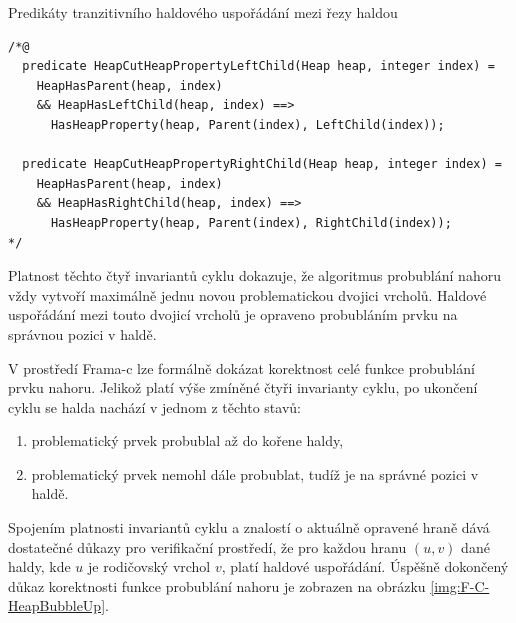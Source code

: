 \begin{listing}[H]
	\caption{Predikáty tranzitivního haldového uspořádání mezi řezy haldou}
	\label{acsl:HeapCutHeapPropertyTransitive}
	\begin{verbatim}
/*@
  predicate HeapCutHeapPropertyLeftChild(Heap heap, integer index) = 
    HeapHasParent(heap, index)
    && HeapHasLeftChild(heap, index) ==>
      HasHeapProperty(heap, Parent(index), LeftChild(index));

  predicate HeapCutHeapPropertyRightChild(Heap heap, integer index) =
    HeapHasParent(heap, index)
    && HeapHasRightChild(heap, index) ==>
      HasHeapProperty(heap, Parent(index), RightChild(index));
*/
	\end{verbatim}
\end{listing}

Platnost těchto čtyř invariantů cyklu dokazuje, že algoritmus probublání nahoru vždy vytvoří maximálně jednu novou problematickou dvojici vrcholů. Haldové uspořádání mezi touto dvojicí vrcholů je opraveno probubláním prvku na správnou pozici v haldě.

V prostředí Frama-c lze formálně dokázat korektnost celé funkce probublání prvku nahoru. Jelikož platí výše zmíněné čtyři invarianty cyklu, po ukončení cyklu se halda nachází v jednom z těchto stavů:

\begin{enumerate}
  \item problematický prvek probublal až do kořene haldy,
  \item problematický prvek nemohl dále probublat, tudíž je na správné pozici v haldě.
\end{enumerate}

Spojením platnosti invariantů cyklu a znalostí o aktuálně opravené hraně dává dostatečné důkazy pro verifikační prostředí, že pro každou hranu $(u, v)$ dané haldy, kde $u$ je rodičovský vrchol $v$, platí haldové uspořádání. Úspěšně dokončený důkaz korektnosti funkce probublání nahoru je zobrazen na obrázku \ref{img:F-C-HeapBubbleUp}.

